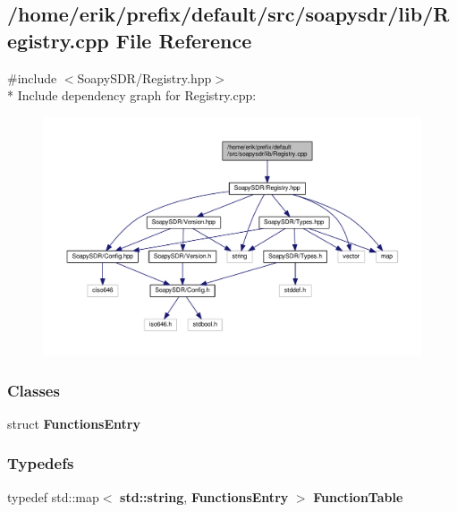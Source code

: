 \subsection{/home/erik/prefix/default/src/soapysdr/lib/\+Registry.cpp File Reference}
\label{Registry_8cpp}
{\ttfamily \#include $<$Soapy\+S\+D\+R/\+Registry.\+hpp$>$}\\*
Include dependency graph for Registry.\+cpp\+:
\nopagebreak
\begin{figure}[H]
\begin{center}
\leavevmode
\includegraphics[width=350pt]{dc/d9b/Registry_8cpp__incl}
\end{center}
\end{figure}
\subsubsection*{Classes}
\begin{DoxyCompactItemize}
\item 
struct {\bf Functions\+Entry}
\end{DoxyCompactItemize}
\subsubsection*{Typedefs}
\begin{DoxyCompactItemize}
\item 
typedef std\+::map$<$ {\bf std\+::string}, {\bf Functions\+Entry} $>$ {\bf Function\+Table}
\end{DoxyCompactItemize}
